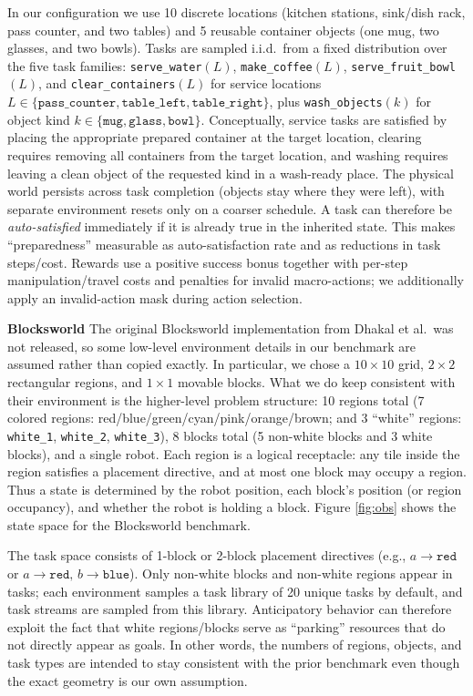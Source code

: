 \documentclass{article}
\begin{document}
In our configuration we use 10 discrete locations (kitchen stations, sink/dish rack, pass counter, and two tables) and 5 reusable container objects (one mug, two glasses, and two bowls). Tasks are sampled i.i.d.\ from a fixed distribution over the five task families: \texttt{serve\_water}$(L)$, \texttt{make\_coffee}$(L)$, \texttt{serve\_fruit\_bowl}$(L)$, and \texttt{clear\_containers}$(L)$ for service locations $L \in \{\texttt{pass\_counter}, \texttt{table\_left}, \texttt{table\_right}\}$, plus \texttt{wash\_objects}$(k)$ for object kind $k \in \{\texttt{mug}, \texttt{glass}, \texttt{bowl}\}$. Conceptually, service tasks are satisfied by placing the appropriate prepared container at the target location, clearing requires removing all containers from the target location, and washing requires leaving a clean object of the requested kind in a wash-ready place. The physical world persists across task completion (objects stay where they were left), with separate environment resets only on a coarser schedule. A task can therefore be \emph{auto-satisfied} immediately if it is already true in the inherited state. This makes ``preparedness'' measurable as auto-satisfaction rate and as reductions in task steps/cost. Rewards use a positive success bonus together with per-step manipulation/travel costs and penalties for invalid macro-actions; we additionally apply an invalid-action mask during action selection.

\noindent\textbf{Blocksworld}
The original Blocksworld implementation from Dhakal et al.\ was not released, so some low-level environment details in our benchmark are assumed rather than copied exactly. In particular, we chose a $10\times 10$ grid, $2\times 2$ rectangular regions, and $1\times 1$ movable blocks. What we do keep consistent with their environment is the higher-level problem structure: 10 regions total (7 colored regions: red/blue/green/cyan/pink/orange/brown; and 3 ``white'' regions: \texttt{white\_1}, \texttt{white\_2}, \texttt{white\_3}), 8 blocks total (5 non-white blocks and 3 white blocks), and a single robot. Each region is a logical receptacle: any tile inside the region satisfies a placement directive, and at most one block may occupy a region. Thus a state is determined by the robot position, each block's position (or region occupancy), and whether the robot is holding a block. Figure \ref{fig:obs} shows the state space for the Blocksworld benchmark.

The task space consists of 1-block or 2-block placement directives (e.g., $a\!\rightarrow\!\texttt{red}$ or $a\!\rightarrow\!\texttt{red},\,b\!\rightarrow\!\texttt{blue}$). Only non-white blocks and non-white regions appear in tasks; each environment samples a task library of 20 unique tasks by default, and task streams are sampled from this library. Anticipatory behavior can therefore exploit the fact that white regions/blocks serve as ``parking'' resources that do not directly appear as goals. In other words, the numbers of regions, objects, and task types are intended to stay consistent with the prior benchmark even though the exact geometry is our own assumption.
\end{document}

